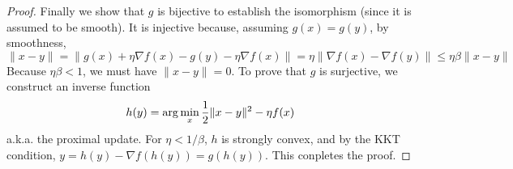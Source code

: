 \begin{example}
\begin{proof}
\noindent
Finally we show that $g$ is bijective to establish the isomorphism (since it is assumed to be smooth). It is injective because, assuming $g(x) = g(y)$, by smoothness,
$$
\|x-y\| = \|g(x) + \eta\nabla f(x) - g(y) - \eta\nabla f(x) \|
 = \eta\|\nabla f(x) - \nabla f(y)\|\leq \eta\beta\|x-y\|
$$
Because $\eta\beta < 1$, we must have $\|x-y\|=0$.
To prove that $g$ is surjective, we construct an inverse function
$$h(y) = \arg\min_x \frac{1}{2}\|x-y\|^2 - \eta f(x)$$
a.k.a. the proximal update. For $\eta < 1/\beta$, $h$ is strongly convex, and by the KKT condition,
$y = h(y) - \nabla f(h(y)) = g(h(y))$. This conpletes the proof.
\end{proof}

\end{example}